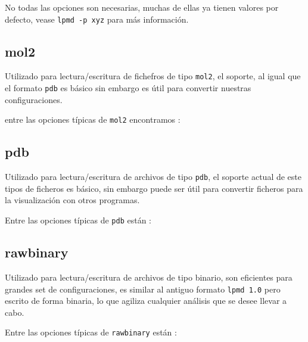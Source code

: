 No todas las opciones son necesarias, muchas de ellas ya tienen valores por defecto, vease \verb|lpmd -p xyz| para m\'as informaci\'on.

\subsection{mol2}
Utilizado para lectura/escritura de fichefros de tipo \verb|mol2|, el soporte, al igual que el formato \verb|pdb| es b\'asico sin embargo es \'util para convertir nuestras configuraciones.

entre las opciones t\'ipicas de \verb|mol2| encontramos :


\subsection{pdb}
Utilizado para lectura/escritura de archivos de tipo \verb|pdb|, el soporte actual de este tipos de ficheros es b\'asico, sin embargo puede ser \'util para convertir ficheros para la visualizaci\'on con otros programas.

Entre las opciones t\'ipicas de \verb|pdb| est\'an :


\subsection{rawbinary}
Utilizado para lectura/escritura de archivos de tipo binario, son eficientes para grandes set de configuraciones, es similar al antiguo formato \verb|lpmd 1.0| pero escrito de forma binaria, lo que agiliza cualquier an\'alisis que se desee llevar a cabo.

Entre las opciones t\'ipicas de \verb|rawbinary| est\'an :


